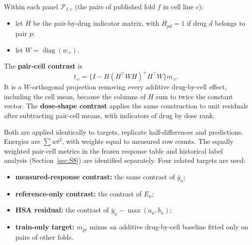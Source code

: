 \documentclass[11pt]{article}
\begin{document}
Within each panel $\mathcal P_{f,c}$ (the pairs of published fold $f$ in cell line $c$):

\begin{itemize}
\item let $H$ be the pair-by-drug indicator matrix, with $H_{pd}=1$ if drug $d$ belongs to pair $p$;
\item let $W=\operatorname{diag}(w_{\cdot c})$.
\end{itemize}
The \textbf{pair-cell contrast} is
\[
t_{\cdot c}=\{I-H(H^\top WH)^{+}H^\top W\}m_{\cdot c}.
\]
It is a $W$-orthogonal projection removing every additive drug-by-cell effect, including the cell mean, because the columns of $H$ sum to twice the constant vector. The \textbf{dose-shape contrast} applies the same construction to unit residuals after subtracting pair-cell means, with indicators of drug by dose rank.

Both are applied identically to targets, replicate half-differences and predictions. Energies are $\sum w t^2$, with weights equal to measured row counts. The equally weighted pair-cell metrics in the frozen response table and historical label analysis (Section~\ref{sec:S8}) are identified separately. Four related targets are used:

\begin{itemize}
\item \textbf{measured-response contrast:} the same contrast of $\bar y_u$;
\item \textbf{reference-only contrast:} the contrast of $E_u$;
\item \textbf{HSA residual:} the contrast of $\bar y_u-\max(a_u,b_u)$;
\item \textbf{train-only target:} $m_{pc}$ minus an additive drug-by-cell baseline fitted only on pairs of other folds.
\end{itemize}
\end{document}
